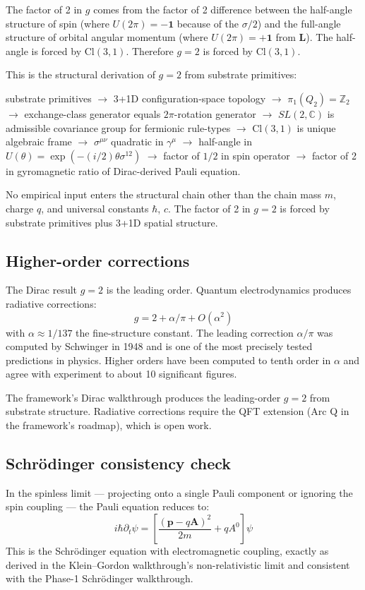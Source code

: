 \documentclass[11pt,a4paper]{article}
\begin{document}
The factor of 2 in $g$ comes from the factor of 2 difference between the half-angle structure of spin (where $U(2\pi) = -\mathbf{1}$ because of the $\sigma/2$) and the full-angle structure of orbital angular momentum (where $U(2\pi) = +\mathbf{1}$ from $\mathbf{L}$). The half-angle is forced by $\mathrm{Cl}(3,1)$. Therefore $g = 2$ is forced by $\mathrm{Cl}(3,1)$.

This is the structural derivation of $g = 2$ from substrate primitives:

substrate primitives $\to$ 3+1D configuration-space topology $\to$ $\pi_1(Q_2) = \mathbb{Z}_2$ $\to$ exchange-class generator equals $2\pi$-rotation generator $\to$ $SL(2, \mathbb{C})$ is admissible covariance group for fermionic rule-types $\to$ $\mathrm{Cl}(3,1)$ is unique algebraic frame $\to$ $\sigma^{\mu\nu}$ quadratic in $\gamma^\mu$ $\to$ half-angle in $U(\theta) = \exp(-(i/2)\theta\sigma^{12})$ $\to$ factor of $1/2$ in spin operator $\to$ factor of 2 in gyromagnetic ratio of Dirac-derived Pauli equation.

No empirical input enters the structural chain other than the chain mass $m$, charge $q$, and universal constants $\hbar$, $c$. The factor of 2 in $g = 2$ is forced by substrate primitives plus 3+1D spatial structure.

\subsection{Higher-order corrections}

The Dirac result $g = 2$ is the leading order. Quantum electrodynamics produces radiative corrections:
\[
g = 2 + \alpha/\pi + O(\alpha^{2})
\]
with $\alpha \approx 1/137$ the fine-structure constant. The leading correction $\alpha/\pi$ was computed by Schwinger in 1948 and is one of the most precisely tested predictions in physics. Higher orders have been computed to tenth order in $\alpha$ and agree with experiment to about 10 significant figures.

The framework's Dirac walkthrough produces the leading-order $g = 2$ from substrate structure. Radiative corrections require the QFT extension (Arc Q in the framework's roadmap), which is open work.

\subsection{Schr\"odinger consistency check}

In the spinless limit --- projecting onto a single Pauli component or ignoring the spin coupling --- the Pauli equation reduces to:
\[
i\hbar\partial_t\psi = \left[\frac{(\mathbf{p} - q\mathbf{A})^2}{2m} + qA^0\right]\psi
\]
This is the Schr\"odinger equation with electromagnetic coupling, exactly as derived in the Klein--Gordon walkthrough's non-relativistic limit and consistent with the Phase-1 Schr\"odinger walkthrough.
\end{document}
